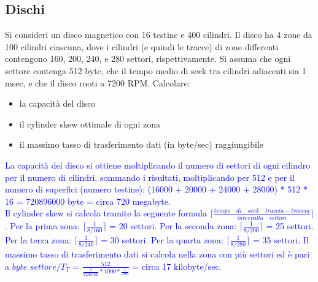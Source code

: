 \documentclass[12pt]{article}
\begin{document}
\subsection{Dischi}
Si consideri un disco magnetico con 16 testine e 400 cilindri. Il disco ha 4 zone da 100 cilindri ciascuna, dove i cilindri (e quindi le tracce) di zone differenti contengono 160, 200, 240, e 280
settori, rispettivamente. Si assuma che ogni settore contenga 512 byte, che il tempo medio di seek tra cilindri adiacenti sia 1 msec, e che il disco ruoti a 7200 RPM. Calcolare:
\begin{itemize}
    \item la capacità del disco
    \item il cylinder skew ottimale di ogni zona
    \item il massimo tasso di trasferimento dati (in byte/sec) raggiungibile\\
\end{itemize}
\textcolor{blue}{La capacità del disco si ottiene moltiplicando il numero di settori di ogni cilindro per il numero di cilindri, sommando i risultati, moltiplicando per 512 e per il numero di superfici (numero testine):
(16000 + 20000 + 24000 + 28000) *  512 * 16 = 720896000 byte = circa 720 megabyte.\\
Il cylinder skew si calcola tramite la seguente formula $\lceil \frac{tempo \quad di \quad seek \quad traccia-traccia}{intervallo \quad settori} \rceil$. 
Per la prima zona: $\lceil \frac{1}{8 / 160} \rceil$ = 20 settori.
Per la seconda zona: $\lceil \frac{1}{8 / 200} \rceil$ = 25 settori.
Per la terza zona: $\lceil \frac{1}{8 / 240} \rceil$ = 30 settori.
Per la quarta zona: $\lceil \frac{1}{8 / 280} \rceil$ = 35 settori.
Il massimo tasso di trasferimento dati si calcola nella zona con più settori ed è pari a $byte$ $settore/T_T$ = $\frac{512}{\frac{1}{7200/60} * 1000 * \frac{1}{280}}$ = circa 17 kilobyte/sec.}
\end{document}
